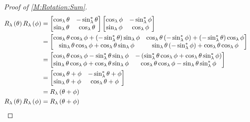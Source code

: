 \documentclass[../methodology.tex]{subfiles}
\begin{document}
\begin{proof}[Proof of \cref{M:Rotation:Sum}]
    \begin{align*}
        R_\lambda\left(\theta\right)R_\lambda\left(\phi\right)
         & =\begin{bmatrix}
                \cos_\lambda{\theta} & -\sin_\lambda^\ast{\theta} \\
                \sin_\lambda{\theta} & \cos_\lambda{\theta}       \\
            \end{bmatrix}
        \begin{bmatrix}
            \cos_\lambda{\phi} & -\sin_\lambda^\ast{\phi} \\
            \sin_\lambda{\phi} & \cos_\lambda{\phi}       \\
        \end{bmatrix}                                                                           \\
         & =\begin{bmatrix}
                \cos_\lambda{\theta}\cos_\lambda{\phi}+\left(-\sin_\lambda^\ast{\theta}\right)\sin_\lambda{\phi} &
                \cos_\lambda{\theta}\left(-\sin_\lambda^\ast{\phi}\right)+\left(-\sin_\lambda^\ast{\theta}\right)\cos_\lambda{\phi} \\
                \sin_\lambda{\theta}\cos_\lambda{\phi}+\cos_\lambda{\theta}\sin_\lambda{\phi}                    &
                \sin_\lambda{\theta}\left(-\sin_\lambda^\ast{\phi}\right)+\cos_\lambda{\theta}\cos_\lambda{\phi}                    \\
            \end{bmatrix} \\
         & =\begin{bmatrix}
                \cos_\lambda{\theta}\cos_\lambda{\phi}-\sin_\lambda^\ast{\theta}\sin_\lambda{\phi} &
                -\left(\sin_\lambda^\ast{\theta}\cos_\lambda{\phi}+\cos_\lambda{\theta}\sin_\lambda^\ast{\phi}\right) \\
                \sin_\lambda{\theta}\cos_\lambda{\phi}+\cos_\lambda{\theta}\sin_\lambda{\phi}      &
                \cos_\lambda{\theta}\cos_\lambda{\phi}-\sin_\lambda{\theta}\sin_\lambda^\ast{\phi}                    \\
            \end{bmatrix}               \\
         & =\begin{bmatrix}
                \cos_\lambda{\theta+\phi} & -\sin_\lambda^\ast{\theta+\phi} \\
                \sin_\lambda{\theta+\phi} & \cos_\lambda{\theta+\phi}       \\
            \end{bmatrix}                                                         \\
         & =R_\lambda\left(\theta+\phi\right)                                                                                   \\
        R_\lambda\left(\theta\right)
        R_\lambda\left(\phi\right)
         & =R_\lambda\left(\theta+\phi\right)
         & \qedhere
    \end{align*}
\end{proof}
\end{document}
